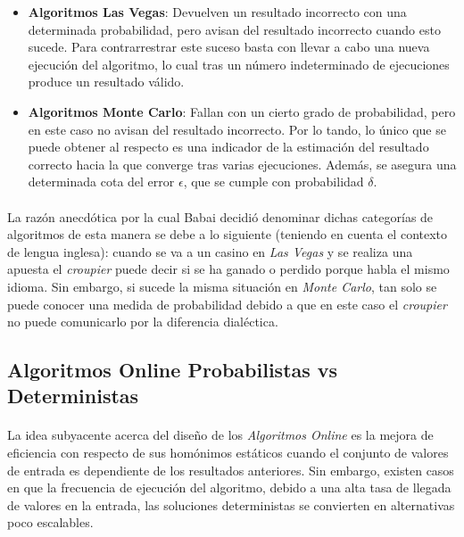 \documentclass{subfiles}
\begin{document}
        \begin{itemize}

          \item \textbf{Algoritmos Las Vegas}: Devuelven un resultado incorrecto con una determinada probabilidad, pero avisan del resultado incorrecto cuando esto sucede. Para contrarrestrar este suceso basta con llevar a cabo una nueva ejecución del algoritmo, lo cual tras un número indeterminado de ejecuciones produce un resultado válido.

          \item \textbf{Algoritmos Monte Carlo}: Fallan con un cierto grado de probabilidad, pero en este caso no avisan del resultado incorrecto. Por lo tando, lo único que se puede obtener al respecto es una indicador de la estimación del resultado correcto hacia la que converge tras varias ejecuciones. Además, se asegura una determinada cota del error $\epsilon$, que se cumple con probabilidad $\delta$.

        \end{itemize}

        \paragraph{}
        La razón anecdótica por la cual Babai \cite{Babai79monte-carloalgorithms} decidió denominar dichas categorías de algoritmos de esta manera se debe a lo siguiente (teniendo en cuenta el contexto de lengua inglesa): cuando se va a un casino en \emph{Las Vegas} y se realiza una apuesta el \emph{croupier} puede decir si se ha ganado o perdido porque habla el mismo idioma. Sin embargo, si sucede la misma situación en \emph{Monte Carlo}, tan solo se puede conocer una medida de probabilidad debido a que en este caso el \emph{croupier} no puede comunicarlo por la diferencia dialéctica.


      \subsection{Algoritmos Online Probabilistas vs Deterministas}

        \paragraph{}
        La idea subyacente acerca del diseño de los \emph{Algoritmos Online} es la mejora de eficiencia con respecto de sus homónimos estáticos cuando el conjunto de valores de entrada es dependiente de los resultados anteriores. Sin embargo, existen casos en que la frecuencia de ejecución del algoritmo, debido a una alta tasa de llegada de valores en la entrada, las soluciones deterministas se convierten en alternativas poco escalables.
\end{document}
